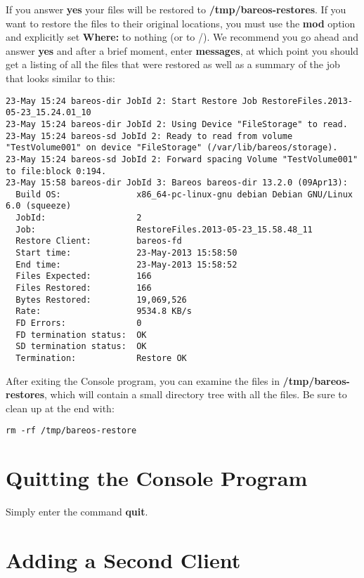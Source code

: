 If you answer {\bf yes} your files will be restored to {\bf
/tmp/bareos-restores}. If you want to restore the files to their original
locations, you must use the {\bf mod} option and explicitly set {\bf Where:}
to nothing (or to /). We recommend you go ahead and answer {\bf yes} and after
a brief moment, enter {\bf messages}, at which point you should get a listing
of all the files that were restored as well as a summary of the job that looks
similar to this:

\footnotesize
\begin{verbatim}
23-May 15:24 bareos-dir JobId 2: Start Restore Job RestoreFiles.2013-05-23_15.24.01_10
23-May 15:24 bareos-dir JobId 2: Using Device "FileStorage" to read.
23-May 15:24 bareos-sd JobId 2: Ready to read from volume "TestVolume001" on device "FileStorage" (/var/lib/bareos/storage).
23-May 15:24 bareos-sd JobId 2: Forward spacing Volume "TestVolume001" to file:block 0:194.
23-May 15:58 bareos-dir JobId 3: Bareos bareos-dir 13.2.0 (09Apr13):
  Build OS:               x86_64-pc-linux-gnu debian Debian GNU/Linux 6.0 (squeeze)
  JobId:                  2
  Job:                    RestoreFiles.2013-05-23_15.58.48_11
  Restore Client:         bareos-fd
  Start time:             23-May-2013 15:58:50
  End time:               23-May-2013 15:58:52
  Files Expected:         166
  Files Restored:         166
  Bytes Restored:         19,069,526
  Rate:                   9534.8 KB/s
  FD Errors:              0
  FD termination status:  OK
  SD termination status:  OK
  Termination:            Restore OK
\end{verbatim}
\normalsize

After exiting the Console program, you can examine the files in {\bf
/tmp/bareos-restores}, which will contain a small directory tree with all the
files. Be sure to clean up at the end with:

\footnotesize
\begin{verbatim}
rm -rf /tmp/bareos-restore
\end{verbatim}
\normalsize

\section{Quitting the Console Program}

Simply enter the command {\bf quit}.
\label{SecondClient}

\section{Adding a Second Client}

